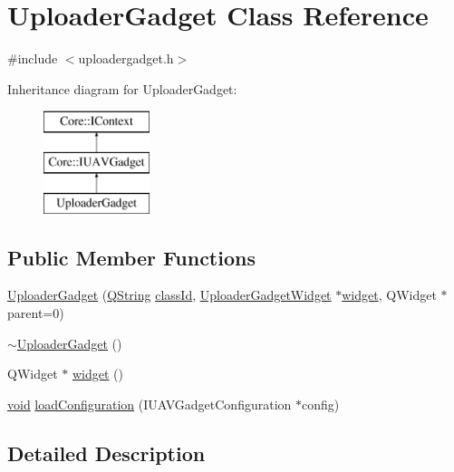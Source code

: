 \hypertarget{class_uploader_gadget}{\section{\-Uploader\-Gadget \-Class \-Reference}
\label{class_uploader_gadget}
}


{\ttfamily \#include $<$uploadergadget.\-h$>$}

\-Inheritance diagram for \-Uploader\-Gadget\-:\begin{figure}[H]
\begin{center}
\leavevmode
\includegraphics[height=3.000000cm]{class_uploader_gadget}
\end{center}
\end{figure}
\subsection*{\-Public \-Member \-Functions}
\begin{DoxyCompactItemize}
\item 
\hyperlink{group___y_modem_uploader_ga900f8a9e862c018370d1fa4331b55b12}{\-Uploader\-Gadget} (\hyperlink{group___u_a_v_objects_plugin_gab9d252f49c333c94a72f97ce3105a32d}{\-Q\-String} \hyperlink{group___core_plugin_ga3878fde66a57220608960bcc3fbeef2c}{class\-Id}, \hyperlink{class_uploader_gadget_widget}{\-Uploader\-Gadget\-Widget} $\ast$\hyperlink{group___y_modem_uploader_gac00d0fe0b9af2cb55ca33b6f0b3ab181}{widget}, \-Q\-Widget $\ast$parent=0)
\item 
\hyperlink{group___y_modem_uploader_ga8337b51a0e1630ae11e7ce9f5a9394b9}{$\sim$\-Uploader\-Gadget} ()
\item 
\-Q\-Widget $\ast$ \hyperlink{group___y_modem_uploader_gac00d0fe0b9af2cb55ca33b6f0b3ab181}{widget} ()
\item 
\hyperlink{group___u_a_v_objects_plugin_ga444cf2ff3f0ecbe028adce838d373f5c}{void} \hyperlink{group___y_modem_uploader_gada75c57a2323cdfbb4d0e349d223b1a3}{load\-Configuration} (\-I\-U\-A\-V\-Gadget\-Configuration $\ast$config)
\end{DoxyCompactItemize}


\subsection{\-Detailed \-Description}


